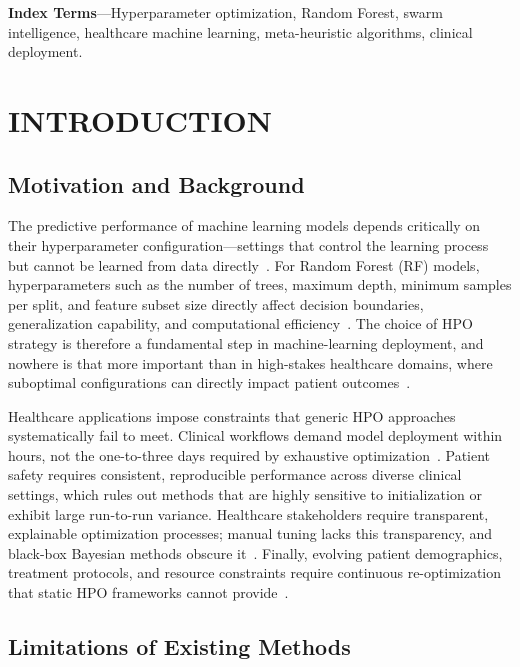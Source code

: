 \documentclass[letterpaper, 10 pt, conference]{ieeeconf}
\begin{document}
	\textbf{Index Terms}---Hyperparameter optimization, Random Forest, swarm intelligence, healthcare machine learning, meta-heuristic algorithms, clinical deployment.

	\section{INTRODUCTION}
	\label{sec:intro}

\subsection{Motivation and Background}

The predictive performance of machine learning models depends critically on their hyperparameter configuration---settings that control the learning process but cannot be learned from data directly~\cite{probst2019}. For Random Forest (RF) models, hyperparameters such as the number of trees, maximum depth, minimum samples per split, and feature subset size directly affect decision boundaries, generalization capability, and computational efficiency~\cite{probst2019, breiman2001}. The choice of HPO strategy is therefore a fundamental step in machine-learning deployment, and nowhere is that more important than in high-stakes healthcare domains, where suboptimal configurations can directly impact patient outcomes~\cite{rahimi2016}.

Healthcare applications impose constraints that generic HPO approaches systematically fail to meet. Clinical workflows demand model deployment within hours, not the one-to-three days required by exhaustive optimization~\cite{elgeldawi2021, bischl2023}. Patient safety requires consistent, reproducible performance across diverse clinical settings, which rules out methods that are highly sensitive to initialization or exhibit large run-to-run variance. Healthcare stakeholders require transparent, explainable optimization processes; manual tuning lacks this transparency, and black-box Bayesian methods obscure it~\cite{naik2022}. Finally, evolving patient demographics, treatment protocols, and resource constraints require continuous re-optimization that static HPO frameworks cannot provide~\cite{elgeldawi2021}.

\subsection{Limitations of Existing Methods}
\end{document}
